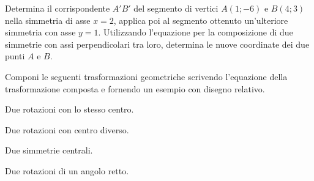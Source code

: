 \begin{esercizio}
\label{ese:8.99} %
Determina il corrispondente $A'B'$ del segmento di vertici $A(1;-6)$ 
e $B(4;3)$ nella simmetria di asse $x = 2$, applica poi al segmento 
ottenuto un'ulteriore simmetria con asse $y = 1$. Utilizzando 
l'equazione per la composizione di due simmetrie con assi 
perpendicolari tra loro, determina le nuove coordinate dei due punti 
$A$ e $B$.
\end{esercizio}

\begin{esercizio}
\label{ese:8.100} %
Componi le seguenti trasformazioni geometriche scrivendo l'equazione 
della trasformazione composta e fornendo un esempio con disegno 
relativo. 
\begin{enumeratea}
\item Due rotazioni con lo stesso centro.
\item Due rotazioni con centro diverso.
\item Due simmetrie centrali.
\item Due rotazioni di un angolo retto.
\end{enumeratea}
\end{esercizio}

